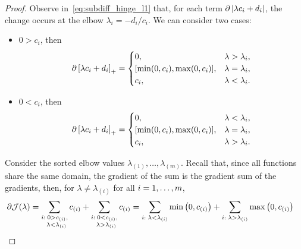 \begin{proof}
    Observe in~\eqref{eq:subdiff_hinge_l1} that, for each term $\partial \left|\lambda c_i + d_i\right|$, the change occurs at the elbow $\lambda_{i} = - d_ i / c_i$. We can consider two cases:
    \begin{itemize}
        \item $0 > c_i$, then
        \begin{equation}
            \nonumber
            \begin{aligned}
                \partial \left[\lambda c_i + d_i\right]_{+} = 
            \begin{cases}
                0 ,& \lambda > \lambda_i, \\
                [\min(0, c_i), \max(0, c_i)] ,& \lambda = \lambda_i, \\
                {c_i} ,& \lambda < \lambda_i .\\
            \end{cases}
            \end{aligned}
        \end{equation}
        \item $0 < c_i$, then
        \begin{equation}
            \nonumber
            \begin{aligned}
                \partial \left[\lambda c_i + d_i\right]_{+} = 
            \begin{cases}
                0 ,& \lambda < \lambda_i, \\
                [\min(0, c_i), \max(0, c_i)] ,& \lambda = \lambda_i, \\
                {c_i} ,& \lambda > \lambda_i .\\
            \end{cases}
            \end{aligned}
        \end{equation}
    \end{itemize}
    Consider the sorted elbow values $\lambda_{(1)}, \ldots, \lambda_{(m)}$.
    Recall that, since all functions share the same domain, the gradient of the sum is the gradient sum of the gradients, then, for $\lambda \neq \lambda_{(i)}$ for all $i=1,\ldots,m$,
    \begin{equation}\nonumber
        \begin{aligned}
            \partial \mathcal{J}(\lambda) &=  \sum_{\substack{i:\; 0 > c_{(i)},\\ \;\; \lambda < \lambda_{(i)}}} {c_{(i)}} + \sum_{\substack{i:\; 0 < c_{(i)},\\ \;\; \lambda > \lambda_{(i)}}} {c_{(i)}}  = \sum_{i: \; \lambda < \lambda_{(i)}} \mymin{0, c_{(i)}} + \sum_{i: \; \lambda > \lambda_{(i)}} \mymax{0, c_{(i)}}

\end{aligned}
\end{equation}
\end{proof}
